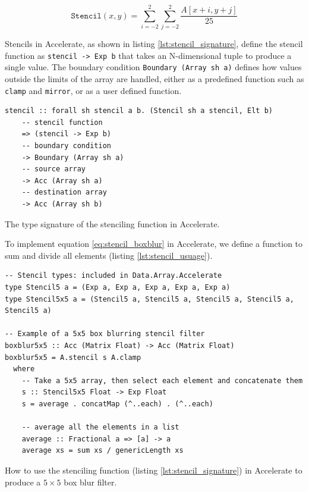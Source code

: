 \begin{equation}
    \texttt{Stencil}(x, y) = %
        \sum_{i=-2}^{2} %
        \sum_{j=-2}^{2} %
        \frac{ A[x + i, y + j] }{25}
    \label{eq:stencil_boxblur}
\end{equation}

Stencils in Accelerate, as shown in listing \ref{lst:stencil_signature}, define the stencil function as \texttt{stencil -> Exp b} that takes an N-dimensional tuple to produce a single value.
The boundary condition \texttt{Boundary (Array sh a)} defines how values outside the limits of the array are handled, either as a predefined function such as \texttt{clamp} and \texttt{mirror}, or as a user defined function.

\begin{listing}[H]
    \begin{verbatim}    
stencil :: forall sh stencil a b. (Stencil sh a stencil, Elt b)	 
    -- stencil function
    => (stencil -> Exp b)
    -- boundary condition
    -> Boundary (Array sh a)	
    -- source array
    -> Acc (Array sh a)	
    -- destination array
    -> Acc (Array sh b)	
    \end{verbatim}
    \caption{
        The type signature of the stenciling function in Accelerate.
    }
    \label{lst:stencil_signature}
\end{listing}

To implement equation \ref{eq:stencil_boxblur} in Accelerate, we define a function to sum and divide all elements (listing \ref{lst:stencil_usuage}).

\begin{listing}[H]
    \begin{verbatim}
-- Stencil types: included in Data.Array.Accelerate
type Stencil5 a = (Exp a, Exp a, Exp a, Exp a, Exp a) 
type Stencil5x5 a = (Stencil5 a, Stencil5 a, Stencil5 a, Stencil5 a, Stencil5 a) 

-- Example of a 5x5 box blurring stencil filter
boxblur5x5 :: Acc (Matrix Float) -> Acc (Matrix Float)
boxblur5x5 = A.stencil s A.clamp
  where
    -- Take a 5x5 array, then select each element and concatenate them
    s :: Stencil5x5 Float -> Exp Float
    s = average . concatMap (^..each) . (^..each)

    -- average all the elements in a list
    average :: Fractional a => [a] -> a
    average xs = sum xs / genericLength xs
    \end{verbatim}
    \caption{
        How to use the stenciling function (listing \ref{lst:stencil_signature}) in Accelerate to produce a $5 \times 5$ box blur filter.
    }
    \label{lst:stencil_usuage}
\end{listing}

